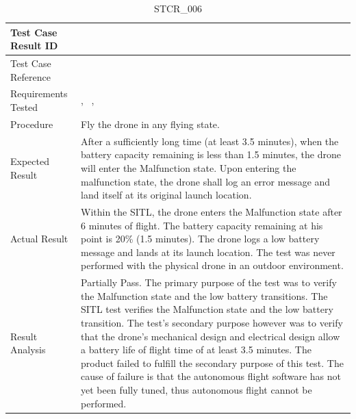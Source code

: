 \documentclass[12pt, titlepage]{article}
\begin{document}
\begin{table}[!h]
\begin{center}
\caption {STCR\_006}
\label{tab:STCR_006}
\begin{tabular}{ | m{3.2cm} | m{12.2cm} | } 
\hline
Test Case Result ID & \nameref{tab:STCR_006} \\ 
\hline
Test Case Reference & \nameref{tab:STC_006}  \\ 
\hline
Requirements Tested & \nameref{SR_011}, \nameref{STA_009}\, \nameref{USE_003}, \nameref{SR_003}
\\  
\hline
Procedure &  Fly the drone in any flying state.  \\ 
\hline
Expected Result & After a sufficiently long time (at least 3.5 minutes), when the battery capacity remaining is less than 1.5 minutes, the drone will enter the Malfunction state. Upon entering the malfunction state, the drone shall log an error message and land itself at its original launch location.   \\ 
\hline
Actual Result & Within the SITL, the drone enters the Malfunction state after 6 minutes of flight. The battery capacity remaining at his point is 20\% (1.5 minutes). The drone logs a low battery message and lands at its launch location. The test was never performed with the physical drone in an outdoor environment. \\ 
\hline
Result Analysis & Partially Pass. The primary purpose of the test was to verify the Malfunction state and the low battery transitions. The SITL test verifies the Malfunction state and the low battery transition. The test's secondary purpose however was to verify that the drone's mechanical design and electrical design allow a battery life of flight time of at least 3.5 minutes. The product failed to fulfill the secondary purpose of this test. The cause of failure is that the autonomous flight software has not yet been fully tuned, thus autonomous flight cannot be performed. \\ 
\hline
\end{tabular}
\end{center}
\end{table}
\end{document}
